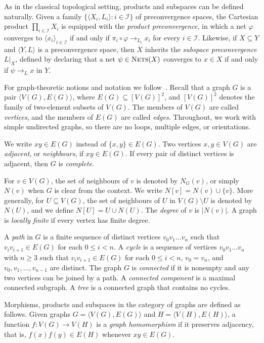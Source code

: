 \documentclass{amsart}
\theoremstyle{definition}
\theoremstyle{remark}
\numberwithin{equation}{section}
\begin{document}
As in the classical topological setting, products and subspaces can be defined naturally. Given a family $\{\langle X_i,L_i\rangle: i\in\mathcal{I}\}$ of preconvergence spaces, the Cartesian product $\prod_{i\in\mathcal{I}}X_i$ is equipped with the \emph{product preconvergence}, in which a net $\varphi$ converges to $\langle x_i\rangle_{i\in\mathcal{I}}$ if and only if $\pi_i\circ\varphi\to_{L_i} x_i$ for every $i\in\mathcal{I}$. Likewise, if $X\subseteq Y$ and $\langle Y,L\rangle$ is a preconvergence space, then $X$ inherits the \emph{subspace preconvergence} $L|_X$, defined by declaring that a net $\psi\in\textsc{Nets}(X)$ converges to $x\in X$ if and only if $\psi\to_L x$ in $Y$.

For graph-theoretic notions and notation we follow~\cite{Diestel2025GraphTheory}. 
Recall that a graph $G$ is a pair $\langle V(G), E(G) \rangle$, where 
$E(G) \subseteq [V(G)]^2$, and $[V(G)]^2$ denotes the family of two-element 
subsets of $V(G)$. The members of $V(G)$ are called \emph{vertices}, and the 
members of $E(G)$ are called \emph{edges}. Throughout, we work with simple 
undirected graphs, so there are no loops, multiple edges, or orientations.

We write $xy\in E(G)$ instead of $\{x,y\}\in E(G)$.
Two vertices $x,y\in V(G)$ are \emph{adjacent}, or \emph{neighbours}, if $xy\in E(G)$. 
If every pair of distinct vertices is adjacent, then $G$ is \emph{complete}.

For $v\in V(G)$, the set of neighbours of $v$ is denoted by $N_G(v)$, or simply $N(v)$ when $G$ is clear from the context. 
We write $N[v]=N(v)\cup\{v\}$. 
More generally, for $U\subseteq V(G)$, the set of neighbours of $U$ in $V(G)\setminus U$ is denoted by $N(U)$, and we define $N[U]=U\cup N(U)$. 
The \emph{degree} of $v$ is $|N(v)|$. 
A graph is \emph{locally finite} if every vertex has finite degree.

A \emph{path} in $G$ is a finite sequence of distinct vertices $v_0v_1\dots v_n$ such that 
$v_iv_{i+1}\in E(G)$ for each $0\le i<n$. A \emph{cycle} is a sequence of vertices 
$v_0v_1\dots v_n$ with $n\ge 3$ such that $v_iv_{i+1}\in E(G)$ for each $0\le i<n$, 
$v_0=v_n$, and $v_0,v_1,\dots,v_{n-1}$ are distinct. The graph $G$ is \emph{connected} 
if it is nonempty and any two vertices can be joined by a path. A \emph{connected component} 
is a maximal connected subgraph. A \emph{tree} is a connected graph that contains no cycles.

Morphisms, products and subspaces in the category of graphs are defined as follows. 
Given graphs $G=\langle V(G),E(G)\rangle$ and $H=\langle V(H),E(H)\rangle$, a function 
$f\colon V(G)\to V(H)$ is a \emph{graph homomorphism} if it preserves adjacency, that is, 
$f(x)f(y)\in E(H)$ whenever $xy\in E(G)$.
\end{document}
